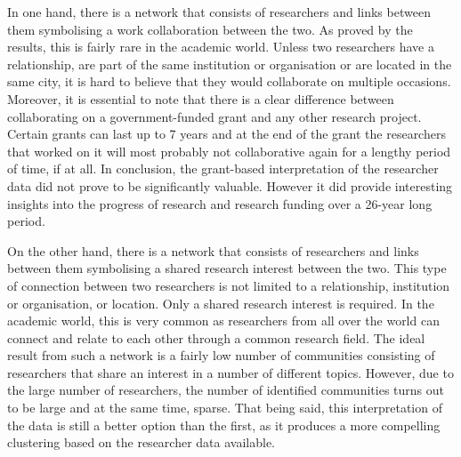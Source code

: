 In one hand, there is a network that consists of researchers and links between them symbolising a work collaboration between the two. As proved by the results, this is fairly rare in the academic world. Unless two researchers have a relationship, are part of the same institution or organisation or are located in the same city, it is hard to believe that they would collaborate on multiple occasions. Moreover, it is essential to note that there is a clear difference between collaborating on a government-funded grant and any other research project. Certain grants can last up to 7 years and at the end of the grant the researchers that worked on it will most probably not collaborative again for a lengthy period of time, if at all. In conclusion, the grant-based interpretation of the researcher data did not prove to be significantly valuable. However it did provide interesting insights into the progress of research and research funding over a 26-year long period.

On the other hand, there is a network that consists of researchers and links between them symbolising a shared research interest between the two. This type of connection between two researchers is not limited to a relationship, institution or organisation, or location. Only a shared research interest is required. In the academic world, this is very common as researchers from all over the world can connect and relate to each other through a common research field. The ideal result from such a network is a fairly low number of communities consisting of researchers that share an interest in a number of different topics. However, due to the large number of researchers, the number of identified communities turns out to be large and at the same time, sparse. That being said, this interpretation of the data is still a better option than the first, as it produces a more compelling clustering based on the researcher data available.